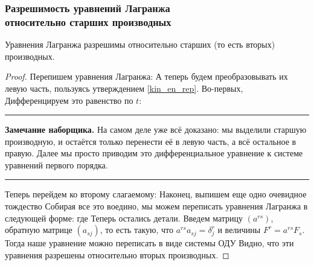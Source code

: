 \documentclass[a4paper,12pt]{article}
\newenvironment{nbb}{\par\vskip3pt\hrule\vskip3pt\textbf{\footnotesize Замечание наборщика.}\footnotesize }
{\vskip3pt\hrule\par\vskip3pt}
\begin{document}
\subsubsection{Разрешимость уравнений Лагранжа\\ относительно старших производных}

\begin{theorem}
Уравнения Лагранжа разрешимы относительно старших (то есть вторых)
производных.
\end{theorem}
\begin{proof}
Перепишем уравнения Лагранжа:
 А
теперь будем преобразовывать их левую часть, пользуясь утверждением
\ref{kin_en_rep}. Во-первых, 
Дифференцируем это равенство по $t$:
\begin{nbb}
На самом деле уже всё доказано: мы выделили старшую производную, и остаётся только перенести её
в левую часть, а всё остальное в правую. Далее мы просто приводим это дифференциальное уравнение
к системе уравнений первого порядка.
\end{nbb}
Теперь перейдем ко второму слагаемому:
Наконец, выпишем еще одно очевидное тождество
Собирая все это воедино, мы можем переписать уравнения
Лагранжа в следующей форме: 
где
 Теперь
остались детали. Введем матрицу $(a^{rs})$, обратную матрице
$(a_{sj})$, то есть такую, что $a^{rs}a_{sj}=\delta^r_j$ и величины
$F^r=a^{rs}F_s$. Тогда наше уравнение можно переписать в виде
системы ОДУ
Видно, что эти уравнения разрешены относительно вторых производных.
\end{proof}
\end{document}
